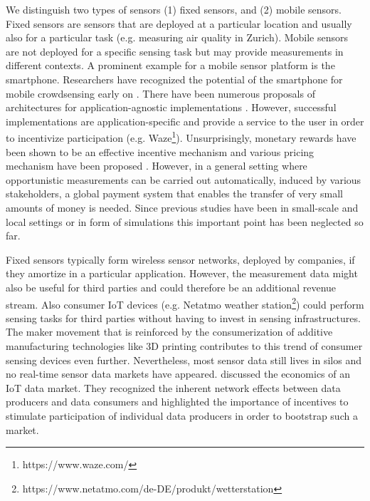\documentclass[a4paper, 12pt]{scrartcl}
\begin{document}
 We distinguish two types of sensors (1) fixed sensors, and (2) mobile sensors. Fixed sensors are sensors that are deployed at a particular location and usually also for a particular task (e.g. measuring air quality in Zurich). Mobile sensors are not deployed for a specific sensing task but may provide measurements in different contexts. A prominent example for a mobile sensor platform is the smartphone. Researchers have recognized the potential of the smartphone for mobile crowdsensing early on \parencite{burke2006participatory,6069707}. There have been numerous proposals of architectures for application-agnostic implementations \parencite{Perera:2014iz,Distefano:2015ir}. However, successful implementations are application-specific and provide a service to the user in order to incentivize participation (e.g. Waze\footnote{https://www.waze.com/}). Unsurprisingly, monetary rewards have been shown to be an effective incentive mechanism and various pricing mechanism have been proposed \parencite{7055221,7065282}. However, in a general setting where opportunistic measurements can be carried out automatically, induced by various stakeholders, a global payment system that enables the transfer of very small amounts of money is needed. Since previous studies have been in small-scale and local settings or in form of simulations this important point has been neglected so far.

Fixed sensors typically form wireless sensor networks, deployed by companies, if they amortize in a particular application. However, the measurement data might also be useful for third parties and could therefore be an additional revenue stream. Also consumer IoT devices (e.g. Netatmo weather station\footnote{https://www.netatmo.com/de-DE/produkt/wetterstation}) could perform sensing tasks for third parties without having to invest in sensing infrastructures. The maker movement \parencite{anderson2013makers} that is reinforced by the consumerization of additive manufacturing technologies like 3D printing contributes to this trend of consumer sensing devices even further. Nevertheless, most sensor data still lives in silos and no real-time sensor data markets have appeared. \cite{Bohli:2009:IOE:1517480.1517491} discussed the economics of an IoT data market. They recognized the inherent network effects between data producers and data consumers and highlighted the importance of incentives to stimulate participation of individual data producers in order to bootstrap such a market. 
\end{document}
